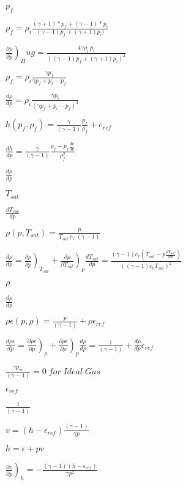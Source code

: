 \documentclass{article}
\begin{document}
$ p_f $
\pagebreak

$ \rho_f =\rho_i\frac{ (\gamma + 1)*p_f + (\gamma - 1)*p_i}{(\gamma - 1)p_f +(\gamma + 1)p_i) }$
\pagebreak

$  \left.  \frac{\partial \rho}{\partial p} \right)_Hug   =  \frac{4\gamma \rho_i \ p_i}{ \left( (\gamma - 1)p_f +(\gamma + 1)p_i \right) ^2}   $
\pagebreak

$ \rho_f = \rho_i \frac{\gamma p_f}{\gamma p_f + p_i - p_f} $
\pagebreak

$ \frac{d\rho}{dp} = \rho_i \frac{\gamma p_i}{\left(\gamma p_f + p_i - p_f\right)^2} $
\pagebreak

$ h(p_f,{\rho_f})= \frac{\gamma}{(\gamma-1)}\frac{p_f}{\rho_f} +e_{ref} $
\pagebreak

$ \frac{dh}{dp}=\frac{\gamma}{(\gamma-1)}\frac{ \rho_f - p_f  \frac{d\rho}{dp}  }{\rho_f^2} $
\pagebreak

$\frac{d\rho}{dp}$
\pagebreak

$T_{sat}$
\pagebreak

$\frac{d T_{sat}}{d p}$
\pagebreak

$  \rho(p, T_{sat})  =  \frac{p}{T_{sat} \ c_v \ (\gamma-1)}\ $
\pagebreak

$\frac{d \rho}{d p} = \left.  \frac{\partial \rho}{\partial p} \right)_{T_{sat}} + \left.  \frac{\partial \rho}{\partial T_{sat} } \right)_p \frac{d T_{sat}}{d p}  =\frac{(\gamma-1)c_v\left(T_{sat} - p\frac{d T_{sat}}{d p}\right) }{\left((\gamma-1)c_vT_{sat}\right)^2 }$
\pagebreak

$ \rho $
\pagebreak

$\frac{d \rho}{d p}$
\pagebreak

$  \rho\epsilon(p, \rho)  =  \frac{p}{(\gamma-1)} +\rho\epsilon_{ref}$
\pagebreak

$ \frac{d \rho\epsilon}{d p} =\left.  \frac{\partial \rho\epsilon}{\partial p} \right)_{\rho} + \left.  \frac{\partial \rho\epsilon}{\partial\rho  } \right)_p \frac{d \rho}{d p}  = \frac{1}{(\gamma-1)} +\frac{d \rho}{d p}\epsilon_{ref} $
\pagebreak

$  \frac{\gamma p_{\infty}}{(\gamma-1)} = 0 \;for\; Ideal\; Gas$
\pagebreak

$    \epsilon_{ref} $
\pagebreak

$  \frac{1}{(\gamma-1)}$
\pagebreak

$ v= (h - \epsilon_{ref})\frac{(\gamma-1)}{\gamma p} $
\pagebreak

$ h=\epsilon +pv $
\pagebreak

$ \left. \frac{\partial v}{\partial p} \right)_h = - \frac{(\gamma-1)(h-\epsilon_{ref})}{\gamma p^2} $
\pagebreak
\end{document}
